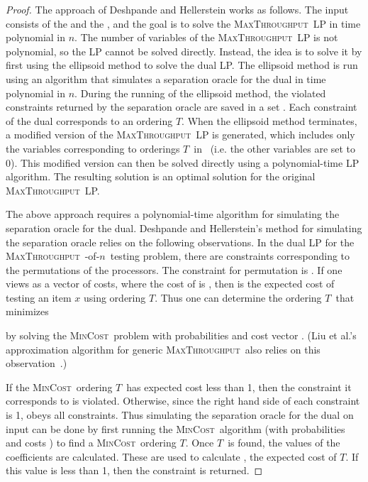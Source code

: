 \documentclass{article}
\newcommand{\ens}[1]{\ensuremath{#1}}					\newcommand{\card}[1]{\ens{|#1|}}							\newcommand{\dotlist}[2]{\ens{#1,\ldots,#2}}
\newcommand{\anitem}{\ens{x}}
\newcommand{\valn}{\ens{n}}
\newcommand{\maxthru}{\textsc{MaxThroughput}}
\newcommand{\mincost}{\textsc{MinCost}}
\newcommand{\oneofn}{-of-\valn}
\newcommand{\strategy}{\ens{T}}
\newcommand{\processor}{processor}
\begin{document}
\begin{proof} 
The  approach of Deshpande and Hellerstein works as follows.  The input consists of
the  and the , and the goal is to solve the
\maxthru\ LP in time polynomial in \valn.
The number of variables of the \maxthru\ LP is not
polynomial, so the LP cannot be 
solved directly.
Instead, the idea is to solve it by first using 
the ellipsoid method to solve the dual LP.
The ellipsoid method is
run using an algorithm that simulates a separation oracle
for the dual in time polynomial in \valn.
During the running of the ellipsoid method, the violated
constraints returned by the separation oracle are saved
in a set \loadratio.  Each constraint of the dual corresponds
to an ordering \strategy.  When the ellipsoid method terminates,
a modified version of the \maxthru\ LP is generated,
which includes only the variables  corresponding to
orderings \strategy\ in \loadratio\ (i.e. the other variables  are
set to 0).  This modified version can then be solved 
directly using a polynomial-time LP algorithm.
The resulting solution is an optimal
solution for the original \maxthru\ LP.

The above approach requires 
a polynomial-time algorithm for simulating the separation oracle
for the dual.  
Deshpande and Hellerstein's method for simulating the
separation oracle relies on the following observations.
In the dual LP for the
\maxthru\, \oneofn\ testing problem,
there are  constraints corresponding to the
 permutations of the {\processor}s.
The constraint for permutation 
is
.
If one views  as a vector of costs, where the cost of 
is , then 
  is the expected cost of testing
an item \anitem{} using ordering \strategy.
Thus one can determine the ordering \strategy\ that minimizes

by solving the \mincost\ problem with probabilities
 and cost vector .
(Liu et al.'s approximation algorithm for generic
\maxthru\ also relies on this observation~\cite{conf/pods/LiuPRY08}.)

If the \mincost\ ordering \strategy\ has expected cost
less than 1, then the constraint it corresponds to is
violated.  Otherwise, since the right hand side of
each constraint is 1,  obeys all constraints.
Thus simulating the separation oracle for
the dual on input  can be done by
first running the \mincost\ algorithm (with probabilities  and costs
) to find a \mincost\ ordering \strategy.  Once \strategy\ is found,
the values of the coefficients  are calculated.
These are used to calculate
, the expected cost of \strategy.  If this value
is less than 1, then the constraint
 is returned.


\end{proof}
\end{document}

